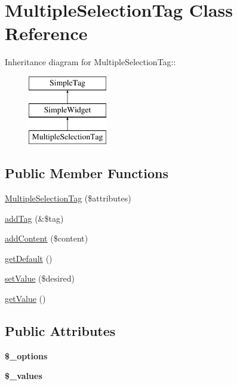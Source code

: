 \hypertarget{class_multiple_selection_tag}{
\section{MultipleSelectionTag Class Reference}
\label{class_multiple_selection_tag}
}
Inheritance diagram for MultipleSelectionTag::\begin{figure}[H]
\begin{center}
\leavevmode
\includegraphics[height=3cm]{class_multiple_selection_tag}
\end{center}
\end{figure}
\subsection*{Public Member Functions}
\begin{DoxyCompactItemize}
\item 
\hyperlink{class_multiple_selection_tag_ad6478ee354b87d1f8a4824e191d9f8ec}{MultipleSelectionTag} (\$attributes)
\item 
\hyperlink{class_multiple_selection_tag_a3dff5d342339cf7f4d07acc3826e807f}{addTag} (\&\$tag)
\item 
\hyperlink{class_multiple_selection_tag_a189718260cdafedf3038e7aa9cdcf381}{addContent} (\$content)
\item 
\hyperlink{class_multiple_selection_tag_a3fa45878dee4cde402bc5a36dc3b3a80}{getDefault} ()
\item 
\hyperlink{class_multiple_selection_tag_a856ea3732ddfc727b1196ac769d5e487}{setValue} (\$desired)
\item 
\hyperlink{class_multiple_selection_tag_a4a3e75f773c42108d27fdc5c73cb0d55}{getValue} ()
\end{DoxyCompactItemize}
\subsection*{Public Attributes}
\begin{DoxyCompactItemize}
\item 
\hypertarget{class_multiple_selection_tag_af3bd56e0da0f32d95d4074781dc8dc05}{
{\bfseries \$\_\-options}}
\label{class_multiple_selection_tag_af3bd56e0da0f32d95d4074781dc8dc05}

\item 
\hypertarget{class_multiple_selection_tag_aa862a61abd15746b425344e66277169f}{
{\bfseries \$\_\-values}}
\label{class_multiple_selection_tag_aa862a61abd15746b425344e66277169f}

\end{DoxyCompactItemize}


